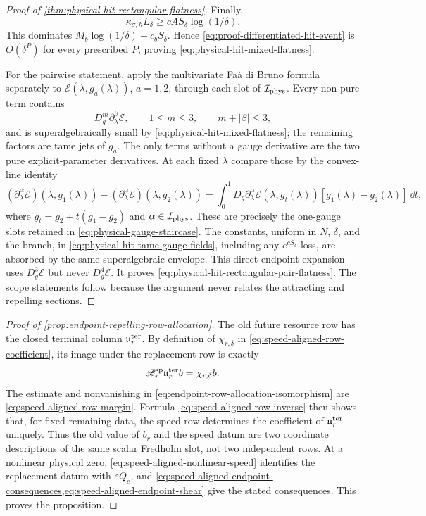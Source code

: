 \begin{proof}[Proof of
\cref{thm:physical-hit-rectangular-flatness}]
Finally,
\[
 \kappa_{\sigma,h}L_\delta
 \ge cA S_\delta\log(1/\delta).
\]
This dominates
$M_b\log(1/\delta)+c_bS_\delta$.
Hence \cref{eq:proof-differentiated-hit-event} is $O(\delta^P)$ for
every prescribed $P$, proving
\cref{eq:physical-hit-mixed-flatness}.

For the pairwise statement, apply the multivariate Fa\`a di Bruno formula
separately to
$\mathcal E(\lambda,g_a(\lambda))$, $a=1,2$, through each slot of
$\mathcal I_{\rm phys}$.  Every non-pure term contains
\begin{equation}
 D_g^m\partial_\lambda^\beta\mathcal E,
 \qquad 1\le m\le3,\qquad m+|\beta|\le3,        \label{eq:proof-composite-gauge-slots}
\end{equation}
and is superalgebraically small by
\cref{eq:physical-hit-mixed-flatness}; the remaining factors are tame jets
of $g_a$.  The only terms without a gauge derivative are the two pure
explicit-parameter derivatives.  At each fixed $\lambda$ compare those by
the convex-line identity
\begin{equation}
 (\partial_\lambda^\alpha\mathcal E)(\lambda,g_1(\lambda))
 -(\partial_\lambda^\alpha\mathcal E)(\lambda,g_2(\lambda))
 =\int_0^1D_g\partial_\lambda^\alpha
       \mathcal E(\lambda,g_t(\lambda))
       [g_1(\lambda)-g_2(\lambda)]\,\dd t,        \label{eq:proof-rectangular-gauge-integration}
\end{equation}
where $g_t=g_2+t(g_1-g_2)$ and
$\alpha\in\mathcal I_{\rm phys}$.  These are precisely the one-gauge
slots retained in \cref{eq:physical-gauge-staircase}.  The constants,
uniform in $N$, $\delta$, and the branch, in
\cref{eq:physical-hit-tame-gauge-fields}, including any
$e^{cS_\delta}$ loss, are absorbed by the same superalgebraic envelope.
This direct endpoint expansion uses $D_g^3\mathcal E$ but never
$D_g^4\mathcal E$.  It proves
\cref{eq:physical-hit-rectangular-pair-flatness}.  The scope statements
follow because the argument never relates the attracting and repelling
sections.
\end{proof}

\begin{proof}[Proof of
\cref{prop:endpoint-repelling-row-allocation}]
The old future resource row has the closed terminal column
\(\mathfrak u_r^{\rm ter}\).  By definition of
\(\chi_{r,\delta}\) in
\cref{eq:speed-aligned-row-coefficient}, its image under the replacement
row is exactly
\[
 \mathscr B_r^{\rm sp}\mathfrak u_r^{\rm ter}b
 =\chi_{r,\delta}b.
\]
The estimate and nonvanishing in
\cref{eq:endpoint-row-allocation-isomorphism} are
\cref{eq:speed-aligned-row-margin}.  Formula
\cref{eq:speed-aligned-row-inverse} then shows that, for fixed remaining
data, the speed row determines the coefficient of
\(\mathfrak u_r^{\rm ter}\) uniquely.  Thus the old value of \(b_r\) and
the speed datum are two coordinate descriptions of the same scalar
Fredholm slot, not two independent rows.  At a nonlinear physical zero,
\cref{eq:speed-aligned-nonlinear-speed} identifies the replacement datum
with \(\varepsilon Q_e\), and
\cref{eq:speed-aligned-endpoint-consequences,eq:speed-aligned-endpoint-shear}
give the stated consequences.  This proves the proposition.
\end{proof}


